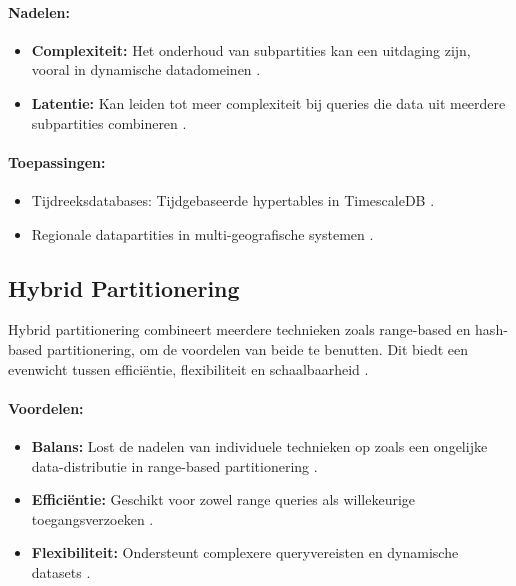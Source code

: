 \paragraph{Nadelen:}
\begin{itemize}
    \item \textbf{Complexiteit:} Het onderhoud van subpartities kan een uitdaging zijn, vooral in dynamische datadomeinen \autocite{Mahmud2020}.
    \item \textbf{Latentie:} Kan leiden tot meer complexiteit bij queries die data uit meerdere subpartities combineren \autocite{Mahmud2020}.
\end{itemize}

\paragraph{Toepassingen:}
\begin{itemize}
    \item Tijdreeksdatabases: Tijdgebaseerde hypertables in TimescaleDB \autocite{Mahmud2020}.
    \item Regionale datapartities in multi-geografische systemen \autocite{Mahmud2020}.
\end{itemize}

\subsection{Hybrid Partitionering}
Hybrid partitionering combineert meerdere technieken zoals range-based en hash-based partitionering, om de voordelen van beide te benutten. Dit biedt een evenwicht tussen efficiëntie, flexibiliteit en schaalbaarheid \autocite{Mahmud2020}.

\paragraph{Voordelen:}
\begin{itemize}
    \item \textbf{Balans:} Lost de nadelen van individuele technieken op zoals een ongelijke data-distributie in range-based partitionering \autocite{Mahmud2020}.
    \item \textbf{Efficiëntie:} Geschikt voor zowel range queries als willekeurige toegangsverzoeken \autocite{Mahmud2020}.
    \item \textbf{Flexibiliteit:} Ondersteunt complexere queryvereisten en dynamische datasets \autocite{Mahmud2020}.
\end{itemize}

